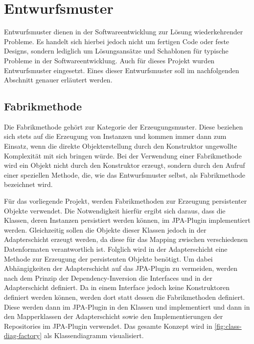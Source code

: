 \chapter{Entwurfsmuster}
Entwurfsmuster dienen in der Softwareentwicklung zur Lösung wiederkehrender Probleme. Es handelt sich hierbei jedoch nicht um fertigen Code oder feste Designs, sondern lediglich um Lösungsansätze und Schablonen für typische Probleme in der Softwareentwicklung. Auch für dieses Projekt wurden Entwurfsmuster eingesetzt. Eines dieser Entwurfsmuster soll im nachfolgenden Abschnitt genauer erläutert werden.

\section{Fabrikmethode}
Die Fabrikmethode gehört zur Kategorie der Erzeugungsmuster. Diese beziehen sich stets auf die Erzeugung von Instanzen und kommen immer dann zum Einsatz, wenn die direkte Objekterstellung durch den Konstruktor ungewollte Komplexität mit sich bringen würde. 
Bei der Verwendung einer Fabrikmethode wird ein Objekt nicht durch den Konstruktor erzeugt, sondern durch den Aufruf einer speziellen Methode, die, wie das Entwurfsmuster selbst, als Fabrikmethode bezeichnet wird.

Für das vorliegende Projekt, werden Fabrikmethoden zur Erzeugung persistenter Objekte verwendet. Die Notwendigkeit hierfür ergibt sich daraus, dass die Klassen, deren Instanzen persistiert werden können, im \acs{JPA}-Plugin implementiert werden. Gleichzeitig sollen die Objekte dieser Klassen jedoch in der Adapterschicht erzeugt werden, da diese für das Mapping zwischen verschiedenen Datenformaten verantwortlich ist. Folglich wird in der Adapterschicht eine Methode zur Erzeugung der persistenten Objekte benötigt. Um dabei Abhängigkeiten der Adapterschicht auf das \acs{JPA}-Plugin zu vermeiden, werden nach dem Prinzip der Dependency-Inversion die Interfaces  und  in der Adapterschicht definiert. Da in einem Interface jedoch keine Konstruktoren definiert werden können, werden dort statt dessen die Fabrikmethoden definiert. Diese werden dann im \acs{JPA}-Plugin in den Klassen  und  implementiert und dann in den Mapperklassen der Adapterschicht sowie den Implementierungen der Repositories im \acs{JPA}-Plugin verwendet. Das gesamte Konzept wird in \autoref{fig:class-diag-factory} als Klassendiagramm visualisiert.


